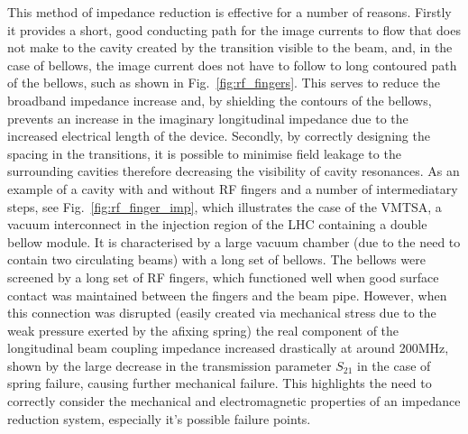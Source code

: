 This method of impedance reduction is effective for a number of reasons. Firstly it provides a short, good conducting path for the image currents to flow that does not make to the cavity created by the transition visible to the beam, and, in the case of bellows, the image current does not have to follow to long contoured path of the bellows, such as shown in Fig.~\ref{fig:rf_fingers}. This serves to reduce the broadband impedance increase and, by shielding the contours of the bellows, prevents an increase in the imaginary longitudinal impedance due to the increased electrical length of the device. Secondly, by correctly designing the spacing in the transitions, it is possible to minimise field leakage to the surrounding cavities therefore decreasing the visibility of cavity resonances. As an example of a cavity with and without RF fingers and a number of intermediatary steps, see Fig.~\ref{fig:rf_finger_imp}, which illustrates the case of the VMTSA, a vacuum interconnect in the injection region of the LHC \cite{Salvant:VMTSA} containing a double bellow module. It is characterised by a large vacuum chamber (due to the need to contain two circulating beams) with a long set of bellows. The bellows were screened by a long set of RF fingers, which functioned well when good surface contact was maintained between the fingers and the beam pipe. However, when this connection was disrupted (easily created via mechanical stress due to the weak pressure exerted by the afixing spring) the real component of the longitudinal beam coupling impedance increased drastically at around 200MHz, shown by the large decrease in the transmission parameter $S_{21}$ in the case of spring failure, causing further mechanical failure. This highlights the need to correctly consider the mechanical and electromagnetic properties of an impedance reduction system, especially it's possible failure points.


